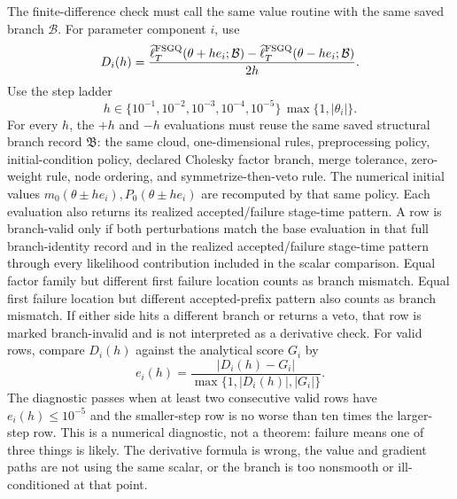 \documentclass[11pt]{article}
\numberwithin{equation}{section}
\newcommand{\ellhat}{\widehat\ell}
\begin{document}
The finite-difference check must call the same value routine with the same
saved branch \(\mathcal B\).  For parameter component \(i\), use
\begin{equation}
  D_i(h)
  =
  \frac{
  \ellhat_T^{\rm FSGQ}(\theta+he_i;\mathcal B)
  -
  \ellhat_T^{\rm FSGQ}(\theta-he_i;\mathcal B)}
  {2h}.
  \label{eq:p31-central-diff}
\end{equation}
Use the step ladder
\begin{equation}
  h\in\{10^{-1},10^{-2},10^{-3},10^{-4},10^{-5}\}\,
  \max\{1,|\theta_i|\}.
  \label{eq:p31-fd-ladder}
\end{equation}
For every \(h\), the \(+\!h\) and \(-\!h\) evaluations must reuse the same
saved structural branch record \(\mathfrak B\): the same cloud,
one-dimensional rules, preprocessing policy, initial-condition policy,
declared Cholesky factor branch, merge tolerance, zero-weight rule, node
ordering, and symmetrize-then-veto rule.  The numerical initial values
\(m_0(\theta\pm he_i),P_0(\theta\pm he_i)\) are recomputed by that same policy.
Each evaluation also returns its realized accepted/failure stage-time pattern.
A row is branch-valid only if both perturbations match the base evaluation in
that full branch-identity record and in the realized accepted/failure
stage-time pattern through every likelihood contribution included in the scalar
comparison.  Equal factor family but different first failure location counts as
branch mismatch.  Equal first failure location but different accepted-prefix
pattern also counts as branch mismatch.  If either side hits a different branch
or returns a veto, that row is marked branch-invalid and is not interpreted as a
derivative check.  For valid rows, compare \(D_i(h)\) against the analytical
score \(G_i\) by
\begin{equation}
  e_i(h)=
  \frac{|D_i(h)-G_i|}
  {\max\{1,|D_i(h)|,|G_i|\}}.
  \label{eq:p31-fd-relative-error}
\end{equation}
The diagnostic passes when at least two consecutive valid rows have
\(e_i(h)\le 10^{-5}\) and the smaller-step row is no worse than ten times the
larger-step row.  This is a numerical diagnostic, not a theorem: failure means
one of three things is likely.  The derivative formula is wrong, the value and
gradient paths are not using the same scalar, or the branch is too nonsmooth or
ill-conditioned at that point.
\end{document}

